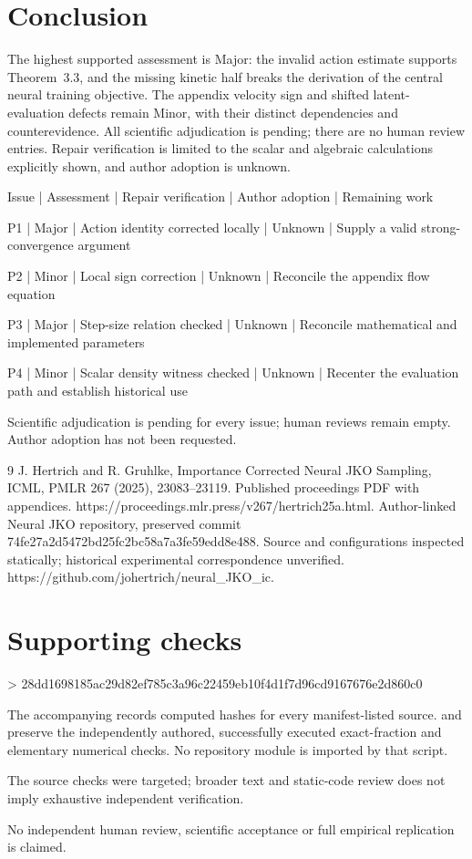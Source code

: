 \documentclass[10pt]{article}
\begin{document}
\section*{Conclusion}
The highest supported assessment is Major: the invalid action estimate supports Theorem 3.3, and the missing kinetic half breaks the derivation of the central neural training objective. The appendix velocity sign and shifted latent-evaluation defects remain Minor, with their distinct dependencies and counterevidence. All scientific adjudication is pending; there are no human review entries. Repair verification is limited to the scalar and algebraic calculations explicitly shown, and author adoption is unknown.\par
Issue | Assessment | Repair verification | Author adoption | Remaining work\par
P1 | Major | Action identity corrected locally | Unknown | Supply a valid strong-convergence argument\par
P2 | Minor | Local sign correction | Unknown | Reconcile the appendix flow equation\par
P3 | Major | Step-size relation checked | Unknown | Reconcile mathematical and implemented parameters\par
P4 | Minor | Scalar density witness checked | Unknown | Recenter the evaluation path and establish historical use\par
Scientific adjudication is pending for every issue; human reviews remain empty. Author adoption has not been requested.\par
9 J. Hertrich and R. Gruhlke, Importance Corrected Neural JKO Sampling, ICML, PMLR 267 (2025), 23083–23119. Published proceedings PDF with appendices. https://proceedings.mlr.press/v267/hertrich25a.html. Author-linked Neural JKO repository, preserved commit 74fe27a2d5472bd25fc2bc58a7a3fe59edd8e488. Source and configurations inspected statically; historical experimental correspondence unverified. https://github.com/johertrich/neural\_JKO\_ic.\par
\section*{Supporting checks}
> 28dd1698185ac29d82ef785c3a96c22459eb10f4d1f7d96cd9167676e2d860c0\par
The accompanying records computed hashes for every manifest-listed source. and preserve the independently authored, successfully executed exact-fraction and elementary numerical checks. No repository module is imported by that script.\par
The source checks were targeted; broader text and static-code review does not imply exhaustive independent verification.\par
No independent human review, scientific acceptance or full empirical replication is claimed.\par
\end{document}

